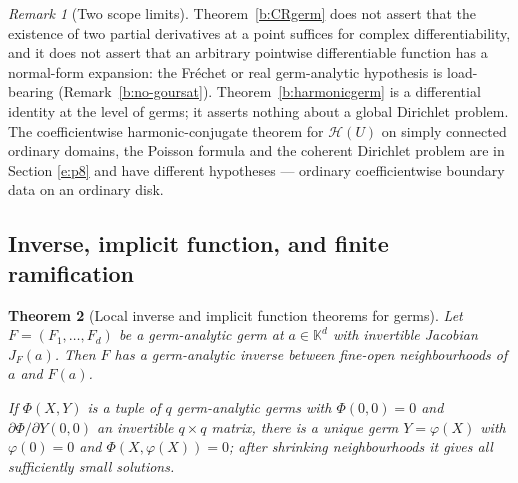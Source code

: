 \documentclass[11pt,a4paper]{article}
\numberwithin{equation}{section}
\newtheorem{theorem}{Theorem}[section]
\theoremstyle{definition}
\theoremstyle{remark}
\newtheorem{remark}[theorem]{Remark}
\theoremstyle{plain}
\newcommand{\K}{\mathbb K}
\newcommand{\Hc}{\mathcal H}
\begin{document}
\begin{remark}[Two scope limits]
\label{b:CRscope}
Theorem~\ref{b:CRgerm} does not assert that the existence of two partial
derivatives at a point suffices for complex differentiability, and it does
not assert that an arbitrary pointwise differentiable function has a
normal-form expansion: the Fr\'echet or real germ-analytic hypothesis is
load-bearing (Remark~\ref{b:no-goursat}). Theorem~\ref{b:harmonicgerm} is
a differential identity at the level of germs; it asserts nothing about a
global Dirichlet problem. The coefficientwise harmonic-conjugate theorem
for $\Hc(U)$ on simply connected ordinary domains, the Poisson formula and
the coherent Dirichlet problem are in Section \ref{e:p8} and have
different hypotheses --- ordinary coefficientwise boundary data on an
ordinary disk.
\end{remark}

\subsection{Inverse, implicit function, and finite ramification}

\begin{theorem}[Local inverse and implicit function theorems for germs]
\label{b:inverse}
Let $F=(F_1,\ldots,F_d)$ be a germ-analytic germ at $a\in\K^{d}$ with
invertible Jacobian $J_F(a)$. Then $F$ has a germ-analytic inverse between
fine-open neighbourhoods of $a$ and $F(a)$.

If $\Phi(X,Y)$ is a tuple of $q$ germ-analytic germs with $\Phi(0,0)=0$
and $\partial\Phi/\partial Y(0,0)$ an invertible $q\times q$ matrix, there
is a unique germ $Y=\varphi(X)$ with $\varphi(0)=0$ and
$\Phi(X,\varphi(X))=0$; after shrinking neighbourhoods it gives all
sufficiently small solutions.
\end{theorem}
\end{document}
